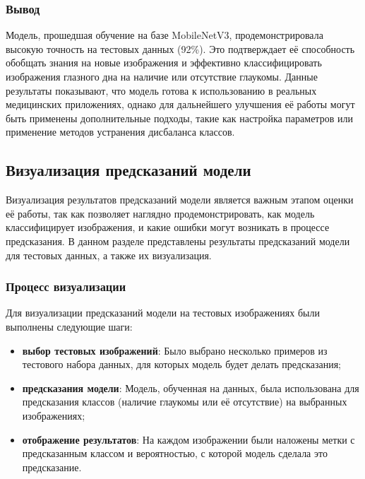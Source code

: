 {    \subsubsection*{Вывод}

    Модель, прошедшая обучение на базе MobileNetV3, продемонстрировала высокую точность на тестовых данных (92\%). Это подтверждает её способность обобщать знания на новые изображения и эффективно классифицировать изображения глазного дна на наличие или отсутствие глаукомы. Данные результаты показывают, что модель готова к использованию в реальных медицинских приложениях, однако для дальнейшего улучшения её работы могут быть применены дополнительные подходы, такие как настройка параметров или применение методов устранения дисбаланса классов.


    \subsection{Визуализация предсказаний модели}

    Визуализация результатов предсказаний модели является важным этапом оценки её работы, так как позволяет наглядно продемонстрировать, как модель классифицирует изображения, и какие ошибки могут возникать в процессе предсказания. В данном разделе представлены результаты предсказаний модели для тестовых данных, а также их визуализация.

    \subsubsection*{Процесс визуализации}

    Для визуализации предсказаний модели на тестовых изображениях были выполнены следующие шаги:

    \begin{itemize}
        \item \textbf{выбор тестовых изображений}: Было выбрано несколько примеров из тестового набора данных, для которых модель будет делать предсказания;
        \item \textbf{предсказания модели}: Модель, обученная на данных, была использована для предсказания классов (наличие глаукомы или её отсутствие) на выбранных изображениях;
        \item \textbf{отображение результатов}: На каждом изображении были наложены метки с предсказанным классом и вероятностью, с которой модель сделала это предсказание.
    \end{itemize}

}
